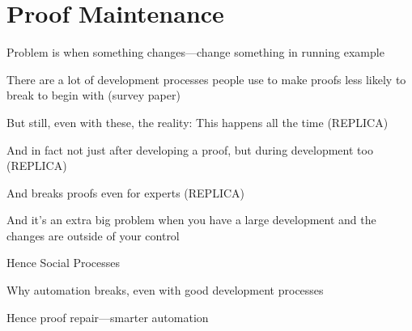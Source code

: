 \section{Proof Maintenance}
\label{sec:mot-mai}

Problem is when something changes---change something in running example

There are a lot of development processes people use to make proofs less likely to break to begin with (survey paper)

But still, even with these, the reality: This happens all the time (REPLICA)

And in fact not just after developing a proof, but during development too (REPLICA)

And breaks proofs even for experts (REPLICA)

And it's an extra big problem when you have a large development and the changes are outside of your control

Hence Social Processes

Why automation breaks, even with good development processes

Hence proof repair---smarter automation


%

%

%

%

%

